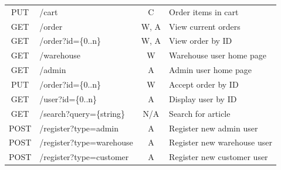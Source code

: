 \documentclass[12pt,a4paper]{report}
\begin{document}
\begin{table}[H]
\begin{tabular}{|clcl|}
\multicolumn{1}{|c|}{PUT}    & \multicolumn{1}{l|}{/cart}                    & \multicolumn{1}{c|}{C}       & Order items in cart                  \\
\multicolumn{1}{|c|}{GET}    & \multicolumn{1}{l|}{/order}                   & \multicolumn{1}{c|}{W, A}    & View current orders                  \\
\multicolumn{1}{|c|}{GET}    & \multicolumn{1}{l|}{/order?id=\{0..n\}}       & \multicolumn{1}{c|}{W, A}    & View order by ID                     \\
\multicolumn{1}{|c|}{GET}    & \multicolumn{1}{l|}{/warehouse}               & \multicolumn{1}{c|}{W}       & Warehouse user home page             \\
\multicolumn{1}{|c|}{GET}    & \multicolumn{1}{l|}{/admin}                   & \multicolumn{1}{c|}{A}       & Admin user home page                 \\
\multicolumn{1}{|c|}{PUT}    & \multicolumn{1}{l|}{/order?id=\{0..n\}}       & \multicolumn{1}{c|}{W}       & Accept order by ID                   \\
\multicolumn{1}{|c|}{GET}    & \multicolumn{1}{l|}{/user?id=\{0..n\}}        & \multicolumn{1}{c|}{A}       & Display user by ID                   \\
\multicolumn{1}{|c|}{GET}    & \multicolumn{1}{l|}{/search?query=\{string\}}        & \multicolumn{1}{c|}{N/A}       & Search for article                   \\
\multicolumn{1}{|c|}{POST}   & \multicolumn{1}{l|}{/register?type=admin}     & \multicolumn{1}{c|}{A}       & Register new admin user              \\
\multicolumn{1}{|c|}{POST}   & \multicolumn{1}{l|}{/register?type=warehouse} & \multicolumn{1}{c|}{A}       & Register new warehouse user          \\
\multicolumn{1}{|c|}{POST}   & \multicolumn{1}{l|}{/register?type=customer}  & \multicolumn{1}{c|}{A}       & Register new customer user           \\ \hline
\end{tabular}
\end{table}
\fi
\end{document}
